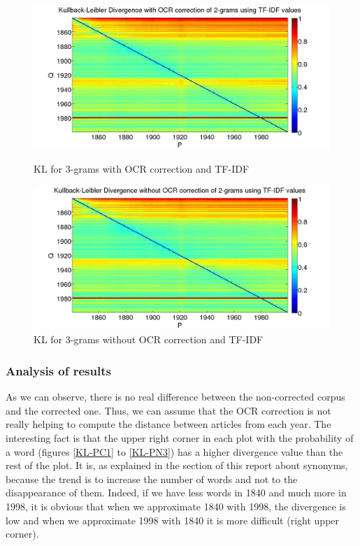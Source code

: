 \begin{figure}[h!]
    \begin{minipage}[b]{0.48\linewidth}
        \includegraphics[scale=0.15]{Pictures/kullback-leibler/KL_2-grams_with_correction_tfidf.jpg}
        \caption{KL for 3-grams with OCR correction and TF-IDF}
        \label{KL-TC3}
    \end{minipage}\hfill
    \begin{minipage}[b]{0.5\linewidth}
        \includegraphics[scale=0.15]{Pictures/kullback-leibler/KL_2-grams_without_correction_tfidf.jpg}
        \caption{KL for 3-grams without OCR correction and TF-IDF}
        \label{KL-TN3}
    \end{minipage}\hfill
\end{figure}

\subsubsection{Analysis of results}
As we can observe, there is no real difference between the non-corrected corpus and the corrected one. Thus, we can assume that the OCR correction is not really helping to compute the distance between articles from each year. The interesting fact is that the upper right corner in each plot with the probability of a word (figures \ref{KL-PC1} to \ref{KL-PN3}) has a higher divergence value than the rest of the plot. It is, as explained in the section of this report about synonyms, because the trend is to increase the number of words and not to the disappearance of them. Indeed, if we have less words in 1840 and much more in 1998, it is obvious that when we approximate 1840 with 1998, the divergence is low and when we approximate 1998 with 1840 it is more difficult (right upper corner).


